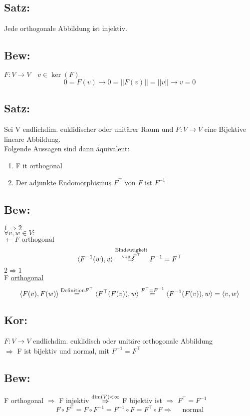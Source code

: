 \documentclass[titlepage,12pt,a4paper,ngerman]{report}
\newcommand{\verteq}{\rotatebox{90}{$\,=$}}
\newcommand{\equalto}[2]{\underset{\scriptstyle\overset{\mkern4mu\verteq}{#2}}{#1}}
\newcommand{\tx}[1]{\textrm{#1}}
\newcommand{\ub}[1]{\underbrace{#1}}
\newcommand{\ska}[2]{\langle #1 , #2 \rangle}
\begin{document}
\subsection{Satz:}
Jede orthogonale Abbildung ist injektiv.
\subsection{Bew:} $ F:V\to V \quad v \in \ker(F)$
$$0 = F(v) \rightarrow 0 = ||F(v)|| = ||v|| \rightarrow v = 0$$
\subsection{Satz:} Sei V endlichdim. euklidischer oder unitärer Raum und $ F: V\to V $ eine Bijektive lineare Abbildung.\\
Folgende Aussagen sind dann äquivalent:
\begin{enumerate}[1)]
	\item F it orthogonal
	\item Der adjunkte Endomorphismus $ F^\top $ von $ F $ ist $ F^{-1} $
\end{enumerate}

\subsection{Bew:}
$ \boxed{1 \Rightarrow 2} $ \\
$ \forall v,w \in V: $\\
$ \leftarrow F \tx{ orthogonal} $\\
$$\ska{F^{-1}(w)}{v}  \buildrel \substack{\tx{Eindeutigkeit}\\\tx{von } F^\top} \over \Rightarrow  F^{-1} = F^\top $$
$ \boxed{2 \Rightarrow 1} $ \\
F \underline{orthogonal}\\
$$\ska{F(v)}{F(w)} \buildrel \tx{Definition} F^\top \over = \ska{F^\top(F(v))}{w} \buildrel F^\top = F^{-1} \over = \ska{F^{-1}(F(v))}{w} = \ska{v}{w}$$

\subsection{Kor:}
$ F: V\to V $ endlichdim. euklidisch oder unitäre orthogonale Abbildung \\
$ \Rightarrow $ F ist bijektiv und normal, mit $ F^{-1} = F^\top $

\subsection{Bew:}
F orthogonal $ \Rightarrow $ F injektiv $ \buildrel \tx{dim}(V) < \infty \over \Rightarrow $ F bijektiv ist $ \Rightarrow $ $ F^\top = F^{-1} $
$$F \circ F^\top = F \circ F^{-1} = F^{-1} \circ F = F^\top \circ F \Rightarrow \quad \tx{ normal}$$
\end{document}

